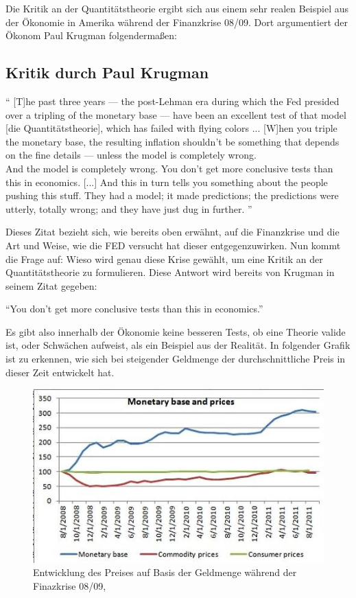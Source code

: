 Die Kritik an der Quantitätstheorie ergibt sich aus einem sehr realen Beispiel aus der Ökonomie in Amerika während der Finanzkrise 08/09. Dort argumentiert der Ökonom Paul Krugman folgendermaßen:

\subsection{Kritik durch Paul Krugman}

\enquote{
[T]he past three years — the post-Lehman era during which the Fed presided over a tripling of the monetary base — have been an excellent test of that model [die Quantitätstheorie], which has failed with flying colors ... [W]hen you triple the monetary base, the resulting inflation shouldn’t be something that depends on the fine details — unless the model is completely wrong.\\
And the model is completely wrong. You don’t get more conclusive tests than this in economics. [...] 
And this in turn tells you something about the people pushing this stuff. They had a model; it made predictions; the predictions were utterly, totally wrong; and they have just dug in further.
}\autocite{Krugman2011} 

Dieses Zitat bezieht sich, wie bereits oben erwähnt, auf die Finanzkrise und die Art und Weise, wie die FED versucht hat dieser entgegenzuwirken. Nun kommt die Frage auf: Wieso wird genau diese Krise gewählt, um eine Kritik an der Quantitätstheorie zu formulieren. Diese Antwort wird bereits von Krugman in seinem Zitat gegeben:
\begin{center}
    \enquote{You don’t get more conclusive tests than this in economics.}
\end{center}

Es gibt also innerhalb der Ökonomie keine besseren Tests, ob eine Theorie valide ist, oder Schwächen aufweist, als ein Beispiel aus der Realität. In folgender Grafik ist zu erkennen, wie sich bei steigender Geldmenge der durchschnittliche Preis in dieser Zeit entwickelt hat.

\begin{figure}[H]
    \centering
    \includegraphics{img/100711krugman3-blog480.jpg}
    \caption{Entwicklung des Preises auf Basis der Geldmenge während der Finazkrise 08/09, \cite{Krugman2011}}
\end{figure}    


